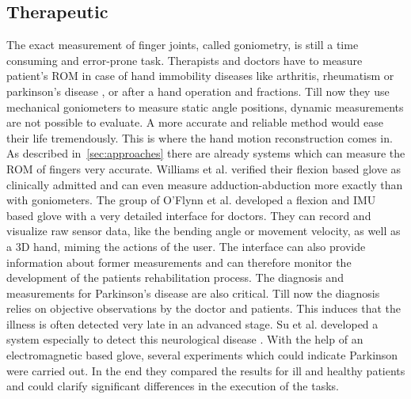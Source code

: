 \subsection{Therapeutic} \label{subsec:applications:reha}
The exact measurement of finger joints, called goniometry, is still a time consuming and error-prone task. Therapists and doctors have to measure patient's \ac{ROM} in case of hand immobility diseases like arthritis, rheumatism \cite{o2013novel} or parkinson's disease \cite{su20033}, or after a hand operation and fractions. Till now they use mechanical goniometers \cite{williams2000goniometric} to measure static angle positions, dynamic measurements are not possible to evaluate. A more accurate and reliable method would ease their life tremendously. This is where the hand motion reconstruction comes in. As described in~\ref{sec:approaches} there are already systems which can measure the \ac{ROM} of fingers very accurate. Williams et al. verified their flexion based glove as clinically admitted and can even measure adduction-abduction more exactly than with goniometers. The group of O'Flynn et al. developed a flexion and \ac{IMU} based glove with a very detailed interface for doctors. They can record and visualize raw sensor data, like the bending angle or movement velocity, as well as a 3D hand, miming the actions of the user. The interface can also provide information about former measurements and can therefore monitor the development of the patients rehabilitation process. The diagnosis and measurements for Parkinson's disease are also critical. Till now the diagnosis relies on objective observations by the doctor and patients. This induces that the illness is often detected very late in an advanced stage. Su et al. developed a system especially to detect this neurological disease \cite{su20033}. With the help of an electromagnetic based glove, several experiments which could indicate Parkinson were carried out. In the end they compared the results for ill and healthy patients and could clarify significant differences in the execution of the tasks.\\
